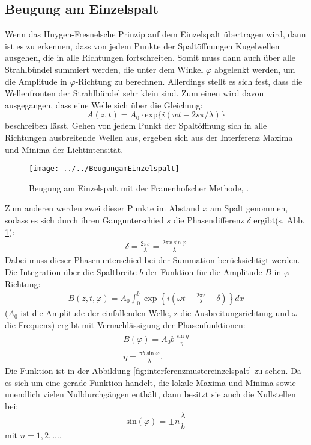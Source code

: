\subsection{Beugung am Einzelspalt}
Wenn das Huygen-Fresnelsche Prinzip auf dem Einzelspalt übertragen wird, dann ist es zu erkennen, dass von jedem Punkte der Spaltöffnungen Kugelwellen ausgehen, die in alle Richtungen fortschreiten. Somit muss dann auch über alle Strahlbündel summiert werden, die unter dem Winkel $\varphi$ abgelenkt werden, um die Amplitude in $\varphi$-Richtung zu berechnen. Allerdings stellt es sich fest, dass die Wellenfronten der Strahlbündel sehr klein sind. Zum einen wird davon ausgegangen, dass eine Welle sich über die Gleichung:
\begin{equation}
A(z,t) = A_0 \cdot \text{exp}\{i(wt-2s\pi/\lambda)\}
\end{equation}
beschreiben lässt. Gehen von jedem Punkt der Spaltöffnung sich in alle Richtungen ausbreitende Wellen aus, ergeben sich aus der Interferenz Maxima und Minima der Lichtintensität.
\begin{figure}[h!]
	\centering
	\texttt{[image: ../../BeugungamEinzelspalt]}
	\caption{Beugung am Einzelspalt mit der Frauenhofscher Methode, \cite[3]{anleitung406}.}
	\label{fig:beugungameinzelspalt}
\end{figure}
Zum anderen werden zwei dieser Punkte im Abstand $x$ am Spalt genommen, sodass es sich durch ihren Gangunterschied $s$ die Phasendifferenz  $\delta$ ergibt(s. Abb. \ref{fig:beugungameinzelspalt}):
\begin{align}
\delta = \frac{2\pi s}{\lambda} = \frac{2\pi x\sin\varphi}{\lambda}
\end{align}
Dabei muss dieser Phasenunterschied bei der Summation berücksichtigt werden. Die Integration über die Spaltbreite $b$ der Funktion für die Amplitude $B$ in $\varphi$-Richtung:
\begin{align}
B(z,t,\varphi)=A_0 \int_0^b \exp\left\{i\left(\omega t - \frac{2\pi z}{\lambda} + \delta\right)\right\}dx
\end{align} 
($A_0$ ist die Amplitude der einfallenden Welle, z die Ausbreitungsrichtung und $\omega$ die Frequenz) ergibt mit Vernachlässigung der Phasenfunktionen:
\begin{align}
B(\varphi)=A_0 b \frac{\sin\eta}{\eta}\\
\eta=\frac{\pi b \sin\varphi}{\lambda}\text{.} 
\end{align} 
Die Funktion ist in der Abbildung \ref{fig:interferenzmustereinzelspalt} zu sehen. Da es sich um eine gerade Funktion handelt, die lokale Maxima und Minima sowie unendlich vielen Nulldurchgängen enthält, dann besitzt sie auch die Nullstellen bei:
\begin{equation}
\text{sin}(\varphi) = \pm n\frac{\lambda}{b}
\end{equation}
mit $n= 1,2,...$.

